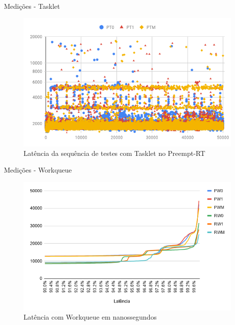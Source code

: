 \documentclass[12pt,brazil]{beamer}
\begin{document}
\begin{frame}{Medições - Tasklet}
    
    \begin{figure}[!htb]
        \centering
        \includegraphics[width=\textwidth]{figures/pt-scatter.png}
        \caption*{Latência da sequência de testes com Tasklet no Preempt-RT}
        \label{grafico:r-softirq}
    \end{figure}

\end{frame}

\begin{frame}{Medições - Workqueue}
    
    \begin{figure}[!htb]
        \centering
        \includegraphics[width=\textwidth]{figures/workqueue.png}
        \caption*{Latência com Workqueue em nanossegundos}
        \label{grafico:softirq}
    \end{figure}

\end{frame}
\end{document}
